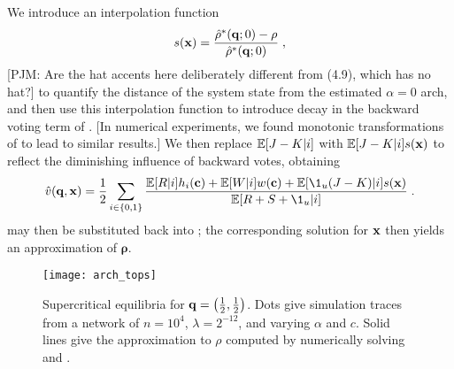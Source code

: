 \documentclass[review, onefignum, onetabnum]{siamart171218}
\newcommand{\pjm}[1]{{\color{blue}[PJM: #1]}}
\begin{document}
		We introduce an interpolation function 
		\begin{align}
			s(\x) = \frac{\hat{\rho}^*(\q;0) - \rho}{\hat{\rho}^*(\q;0)}\;, \label{eq:interpolation}
		\end{align}
        \pjm{Are the hat accents here deliberately different from (4.9), which has no hat?}
		to quantify the distance of the system state from the estimated $\alpha = 0$ arch, and then use this interpolation function to introduce decay in the backward voting term of  . [In numerical experiments, we found monotonic transformations of  to lead to similar results.] 
		We then replace $\mathbb{E}[J - K|i]$ with $\mathbb{E}[J - K|i]s(\mathbf{x})$ to reflect the diminishing influence of backward votes, obtaining 
		\begin{equation}
			\hat{v}(\q, \x) = \frac{1}{2} \sum_{i \in \{0,1\}} \frac{\E[R|i]h_i(\C) + \E[W|i]w(\C) + \E[\1_u(J-K)|i]s(\x)}{\E[R + S + \1_u|i]}\;.  \label{eq:component_approx_super}
		\end{equation}
		 may then be substituted back into ; the corresponding solution for $\mathbf{x}$ then yields an approximation of $\mathbf{\rho}$. 
		\begin{figure}
			\centering
				\texttt{[image: arch\_tops]}
			\caption{Supercritical equilibria for $\mathbf{q} = \left(\frac{1}{2}, \frac{1}{2}\right)$.
			Dots give simulation traces from a network of $n = 10^4$, $\lambda = 2^{-12}$, and varying $\alpha$ and $c$.
			Solid lines give the approximation to $\rho$ computed by numerically solving  and .} \label{fig:arch_tops}
		\end{figure}
		
\end{document}
